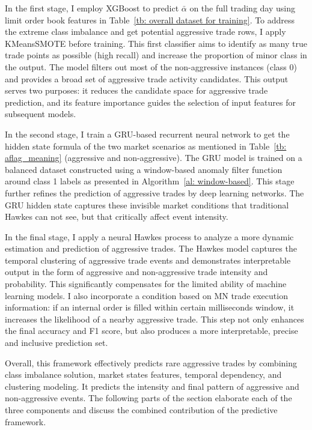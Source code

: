 In the first stage, I employ XGBoost to predict $\bar{\alpha}$ on the full trading day using limit order book features in Table~\ref{tb: overall dataset for training}. To address the extreme class imbalance and get potential aggressive trade rows, I apply KMeansSMOTE before training. This first classifier aims to identify as many true trade points as possible (high recall) and increase the proportion of minor class in the output. The model filters out most of the non-aggressive instances (class 0) and provides a broad set of aggressive trade activity candidates. This output serves two purposes: it reduces the candidate space for aggressive trade prediction, and its feature importance guides the selection of input features for subsequent models.

In the second stage, I train a GRU-based recurrent neural network to get the hidden state formula of the two market scenarios as mentioned in Table~\ref{tb: aflag_meaning} (aggressive and non-aggressive). The GRU model is trained on a balanced dataset constructed using a window-based anomaly filter function around class 1 labels as presented in Algorithm~\ref{al: window-based}. This stage further refines the prediction of aggressive trades by deep learning networks. The GRU hidden state captures these invisible market conditions that traditional Hawkes can not see, but that critically affect event intensity.

In the final stage, I apply a neural Hawkes process to analyze a more dynamic estimation and prediction of aggressive trades. The Hawkes model captures the temporal clustering of aggressive trade events and demonstrates interpretable output in the form of aggressive and non-aggressive trade intensity and probability. This significantly compensates for the limited ability of machine learning models. I also incorporate a condition based on MN trade execution information: if an internal order is filled within certain milliseconds window, it increases the likelihood of a nearby aggressive trade. This step not only enhances the final accuracy and F1 score, but also produces a more interpretable, precise and inclusive prediction set.

Overall, this framework effectively predicts rare aggressive trades by combining class imbalance solution, market states features, temporal dependency, and clustering modeling. It predicts the intensity and final pattern of aggressive and non-aggressive events. The following parts of the section elaborate each of the three components and discuss the combined contribution of the predictive framework.

